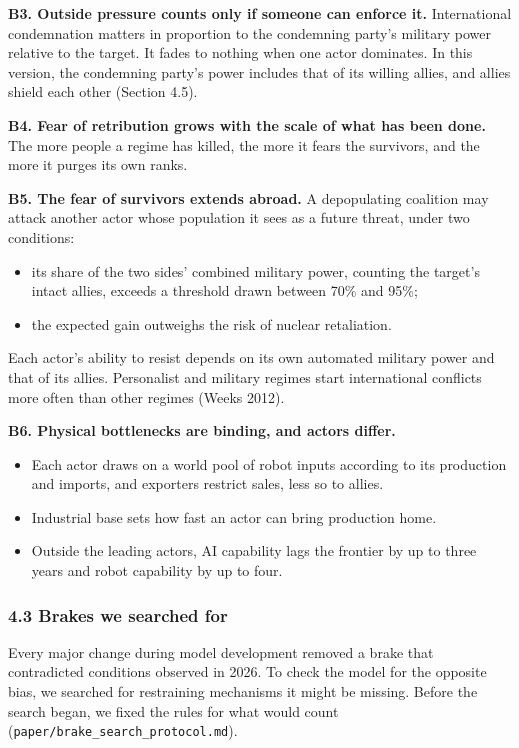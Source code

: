 \documentclass[
  10pt,
]{article}
\providecommand{\tightlist}{%
  \setlength{\itemsep}{0pt}\setlength{\parskip}{0pt}}
\begin{document}
\textbf{B3. Outside pressure counts only if someone can enforce it.} International condemnation
matters in proportion to the condemning party's military power relative to the target. It fades to
nothing when one actor dominates. In this version, the condemning party's power includes that of its
willing allies, and allies shield each other (Section 4.5).

\textbf{B4. Fear of retribution grows with the scale of what has been done.} The more people a
regime has killed, the more it fears the survivors, and the more it purges its own ranks.

\textbf{B5. The fear of survivors extends abroad.} A depopulating coalition may attack another actor
whose population it sees as a future threat, under two conditions:

\begin{itemize}
\tightlist
\item
  its share of the two sides' combined military power, counting the target's intact allies, exceeds
  a threshold drawn between 70\% and 95\%;
\item
  the expected gain outweighs the risk of nuclear retaliation.
\end{itemize}

Each actor's ability to resist depends on its own automated military power and that of its allies.
Personalist and military regimes start international conflicts more often than other regimes (Weeks
2012).

\textbf{B6. Physical bottlenecks are binding, and actors differ.}

\begin{itemize}
\tightlist
\item
  Each actor draws on a world pool of robot inputs according to its production and imports, and
  exporters restrict sales, less so to allies.
\item
  Industrial base sets how fast an actor can bring production home.
\item
  Outside the leading actors, AI capability lags the frontier by up to three years and robot
  capability by up to four.
\end{itemize}

\subsubsection{4.3 Brakes we searched for}\label{brakes-we-searched-for}

Every major change during model development removed a brake that contradicted conditions observed in
2026. To check the model for the opposite bias, we searched for restraining mechanisms it might be
missing. Before the search began, we fixed the rules for what would count
(\texttt{paper/brake\_search\_protocol.md}).
\end{document}
